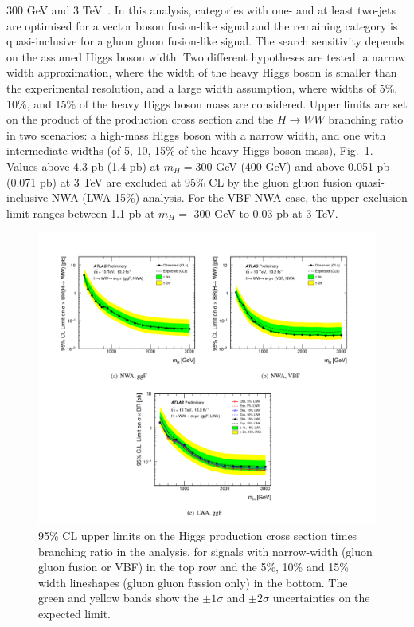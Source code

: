 300 GeV and 3 TeV~\cite{ATLAS-CONF-2016-074}. In this analysis, categories with one- and at least two-jets
are optimised for a vector boson fusion-like signal and the remaining category is quasi-inclusive
for a gluon gluon fusion-like signal. The search sensitivity depends on the assumed Higgs boson width. Two different hypotheses are tested:
a narrow width approximation, where the width of the heavy Higgs boson is smaller than the
experimental resolution, and a large width assumption, where widths of 5\%, 10\%, and 15\% of
the heavy Higgs boson mass are considered.
Upper limits are set on the product of the production cross section and the $H \to WW$ branching ratio in two scenarios:
a high-mass Higgs boson with a narrow width, and one with intermediate widths (of 5, 10, 15\% of the
heavy Higgs boson mass), Fig.~\ref{ATLAS-CONF-2016-074_fig}. Values above 4.3 pb (1.4 pb) at $m_H=$300 GeV (400 GeV) and above 0.051 pb
(0.071 pb) at 3 TeV are excluded at 95\% CL by the gluon gluon fusion quasi-inclusive NWA (LWA 15\%) analysis. For
the VBF NWA case, the upper exclusion limit ranges between 1.1 pb at $m_H=$ 300 GeV to 0.03 pb at 3 TeV.

\begin{figure}
\includegraphics[scale= 0.9]{../Cap1/ATLAS-CONF-2016-074}
\caption{95\% CL upper limits on the Higgs production cross section times branching ratio in the analysis, for signals with narrow-width (gluon gluon fusion or VBF) in the top row and the 5\%, 10\% and 15\% width lineshapes (gluon gluon fussion only) in the bottom. The green and yellow bands show the  $\pm 1\sigma$ and  $\pm 2\sigma$ uncertainties on the expected limit. }
\label{ATLAS-CONF-2016-074_fig}
\end{figure}
